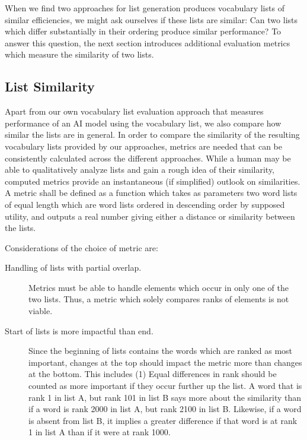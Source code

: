 When we find two approaches for list generation produces vocabulary lists of similar efficiencies, we might ask ourselves if these lists are similar:
Can two lists which differ substantially in their ordering produce similar performance?
To answer this question, the next section introduces additional evaluation metrics which measure the similarity of two lists.


\subsection{List Similarity}
Apart from our own vocabulary list evaluation approach that measures performance of an AI model using the vocabulary list, we also compare how similar the lists are in general.
In order to compare the similarity of the resulting vocabulary lists provided by our approaches, metrics are needed that can be consistently calculated across the different approaches.
While a human may be able to qualitatively analyze lists and gain a rough idea of their similarity, computed metrics provide an instantaneous (if simplified) outlook on similarities.
A metric shall be defined as a function which takes as parameters two word lists of equal length which are word lists ordered in descending order by supposed utility, and outputs a real number giving either a distance or similarity between the lists.

Considerations of the choice of metric are:

\begin{description}
	\item [Handling of lists with partial overlap.]
	      Metrics must be able to handle elements which occur in only one of the two lists.
	      Thus, a metric which solely compares ranks of elements is not viable.
	\item [Start of lists is more impactful than end.]
	      Since the beginning of lists contains the words which are ranked as most important, changes at the top should impact the metric more than changes at the bottom. This includes (1) Equal differences in rank should be counted as more important if they occur further up the list.
	      A word that is rank 1 in list A, but rank 101 in list B says more about the similarity than if a word is rank 2000 in list A, but rank 2100 in list B. Likewise, if a word is absent from list B, it implies a greater difference if that word is at rank 1 in list A than if it were at rank 1000.
\end{description}

